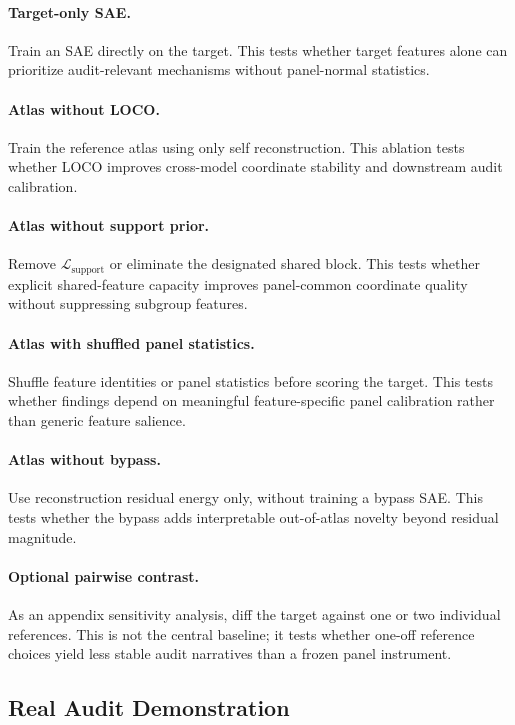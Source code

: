 \documentclass[11pt]{article}
\begin{document}
\paragraph{Target-only SAE.}
Train an SAE directly on the target. This tests whether target features alone can prioritize audit-relevant mechanisms without panel-normal statistics.

\paragraph{Atlas without LOCO.}
Train the reference atlas using only self reconstruction. This ablation tests whether LOCO improves cross-model coordinate stability and downstream audit calibration.

\paragraph{Atlas without support prior.}
Remove $\mathcal{L}_{\mathrm{support}}$ or eliminate the designated shared block. This tests whether explicit shared-feature capacity improves panel-common coordinate quality without suppressing subgroup features.

\paragraph{Atlas with shuffled panel statistics.}
Shuffle feature identities or panel statistics before scoring the target. This tests whether findings depend on meaningful feature-specific panel calibration rather than generic feature salience.

\paragraph{Atlas without bypass.}
Use reconstruction residual energy only, without training a bypass SAE. This tests whether the bypass adds interpretable out-of-atlas novelty beyond residual magnitude.

\paragraph{Optional pairwise contrast.}
As an appendix sensitivity analysis, diff the target against one or two individual references. This is not the central baseline; it tests whether one-off reference choices yield less stable audit narratives than a frozen panel instrument.

\subsection{Real Audit Demonstration}
\end{document}
